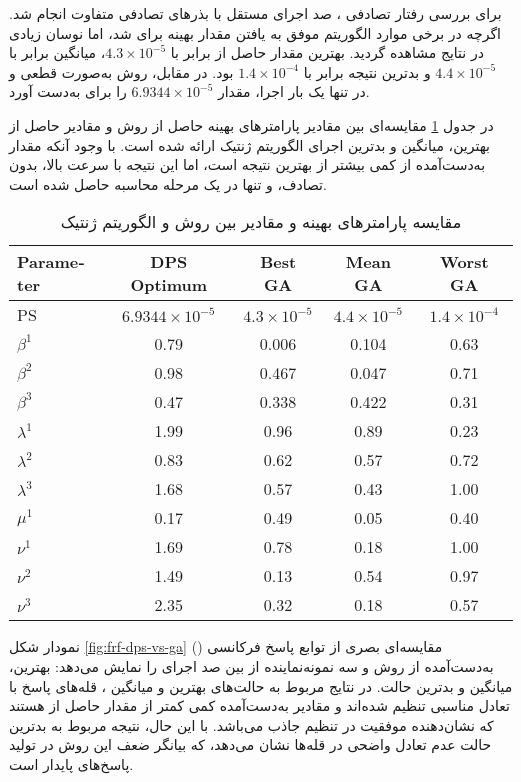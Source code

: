 برای بررسی رفتار تصادفی ، صد اجرای مستقل با بذرهای تصادفی متفاوت انجام شد. اگرچه در برخی موارد الگوریتم موفق به یافتن مقدار بهینه برای  شد، اما نوسان زیادی در نتایج مشاهده گردید. بهترین مقدار  حاصل از  برابر با $4.3 \times 10^{-5}$، میانگین برابر با $4.4 \times 10^{-5}$ و بدترین نتیجه برابر با $1.4 \times 10^{-4}$ بود. در مقابل، روش  به‌صورت قطعی و در تنها یک بار اجرا، مقدار $6.9344 \times 10^{-5}$ را برای  به‌دست آورد.

در جدول \ref{tab:DPS-vs-GA} مقایسه‌ای بین مقادیر پارامترهای بهینه حاصل از روش  و مقادیر حاصل از بهترین، میانگین و بدترین اجرای الگوریتم ژنتیک ارائه شده است. با وجود آنکه مقدار  به‌دست‌آمده از  کمی بیشتر از بهترین نتیجه  است، اما این نتیجه با سرعت بالا، بدون تصادف، و تنها در یک مرحله محاسبه حاصل شده است.

\begin{table}[H]
\centering
\caption{مقایسه پارامترهای بهینه و مقادیر  بین روش  و الگوریتم ژنتیک}
\label{tab:DPS-vs-GA}
\begin{latin}
\begin{tabular}{lcccc}
\hline
\textbf{Parameter} & \textbf{DPS Optimum} & \textbf{Best GA} & \textbf{Mean GA} & \textbf{Worst GA} \\
\hline
PS & $6.9344 \times 10^{-5}$ & $4.3 \times 10^{-5}$ & $4.4 \times 10^{-5}$ & $1.4 \times 10^{-4}$ \\
\hline
$\beta^1$ & 0.79 & 0.006 & 0.104 & 0.63 \\
$\beta^2$ & 0.98 & 0.467 & 0.047 & 0.71 \\
$\beta^3$ & 0.47 & 0.338 & 0.422 & 0.31 \\
$\lambda^1$ & 1.99 & 0.96 & 0.89 & 0.23 \\
$\lambda^2$ & 0.83 & 0.62 & 0.57 & 0.72 \\
$\lambda^3$ & 1.68 & 0.57 & 0.43 & 1.00 \\
$\mu^1$ & 0.17 & 0.49 & 0.05 & 0.40 \\
$\nu^1$ & 1.69 & 0.78 & 0.18 & 1.00 \\
$\nu^2$ & 1.49 & 0.13 & 0.54 & 0.97 \\
$\nu^3$ & 2.35 & 0.32 & 0.18 & 0.57 \\
\hline
\end{tabular}
\end{latin}
\end{table}

نمودار شکل \ref{fig:frf-dps-vs-ga} مقایسه‌ای بصری از توابع پاسخ فرکانسی () به‌دست‌آمده از روش  و سه نمونه‌نماینده از بین صد اجرای  را نمایش می‌دهد: بهترین، میانگین و بدترین حالت. در نتایج مربوط به حالت‌های بهترین و میانگین ، قله‌های پاسخ با تعادل مناسبی تنظیم شده‌اند و مقادیر  به‌دست‌آمده کمی کمتر از مقدار حاصل از  هستند که نشان‌دهنده موفقیت در تنظیم جاذب می‌باشد. با این حال، نتیجه مربوط به بدترین حالت  عدم تعادل واضحی در قله‌ها نشان می‌دهد، که بیانگر ضعف این روش در تولید پاسخ‌های پایدار است.

